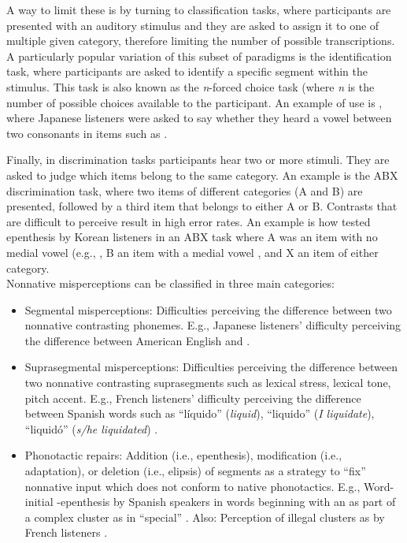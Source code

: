 A way to limit these is by turning to classification tasks, where participants are presented with an auditory stimulus and they are asked to assign it to one of multiple given category, therefore limiting the number of possible transcriptions.
A particularly popular variation of this subset of paradigms is the identification task, where participants are asked to identify a specific segment within the stimulus. This task is also known as the \textit{n}-forced choice task (where \textit{n} is the number of possible choices available to the participant. An example of use is \cite{dupoux1999}, where Japanese listeners were asked to say whether they heard a  vowel between two consonants in items such as .

Finally, in discrimination tasks participants hear two or more stimuli. They are asked to judge which items belong to the same category. An example is the ABX discrimination task, where two items of different categories (A and B) are presented, followed by a third item that belongs to either A or B. Contrasts that are difficult to perceive result in high error rates. An example is how \cite{durvasula2015} tested epenthesis by Korean listeners in an ABX task where A was an item with no medial vowel (e.g., , B an item with a medial vowel , and X an item of either category.     \\  

Nonnative misperceptions can be classified in three main categories:

\begin{itemize}
\item Segmental misperceptions: Difficulties perceiving the difference between two nonnative contrasting phonemes. E.g., Japanese listeners' difficulty perceiving the difference between American English  and  \cite{goto1991, miyawaki1981}.
\item Suprasegmental misperceptions: Difficulties perceiving the difference between two nonnative contrasting suprasegments such as lexical stress, lexical tone, pitch accent. E.g., French listeners' difficulty perceiving the difference between Spanish words such as ``líquido''  (\textit{liquid}), ``liquido''  (\textit{I liquidate}), ``liquidó''  (\textit{s/he liquidated}) \cite{dupoux1997, dupoux2008}.
\item Phonotactic repairs: Addition (i.e., epenthesis), modification (i.e., adaptation), or deletion (i.e., elipsis) of segments as a strategy to ``fix'' nonnative input which does not conform to native phonotactics. E.g., Word-initial -epenthesis by Spanish speakers in words beginning with an  as part of a complex cluster as in ``special'' \cite{halle2014}. Also: Perception of illegal  clusters as  by French listeners \cite{halle2007}.  
\end{itemize}

